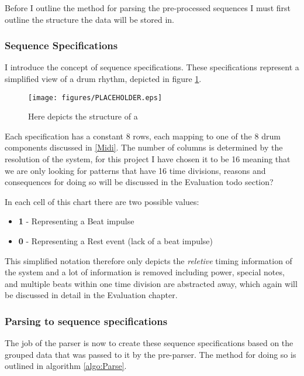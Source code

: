 \documentclass[12pt,twoside,notitlepage]{report}
\begin{document}
			Before I outline the method for parsing the pre-processed sequences I must first outline the structure the data will be stored in.
			
			\subsubsection{Sequence Specifications}
				I introduce the concept of sequence specifications. These specifications represent a simplified view of a drum rhythm, depicted in figure \ref{fig:seqSpec}.
				
            \begin{figure}[h]
			\centerline{\texttt{[image: figures/PLACEHOLDER.eps]}}
			\caption{\label{fig:seqSpec} Here depicts the structure of a }
\end{figure}

				Each specification has a constant 8 rows, each mapping to one of the 8 drum components discussed in \ref{Midi}. The number of columns is determined by the resolution of the system, for this project I have chosen it to be 16 meaning that we are only looking for patterns that have 16 time divisions, reasons and consequences for doing so will be discussed in the Evaluation todo section?
				
				In each cell of this chart there are two possible values:
					\begin{itemize}
						\item{\textbf{1} - Representing a Beat impulse}
						\item{\textbf{0} - Representing a Rest event (lack of a beat impulse)}
					\end{itemize}
					
				This simplified notation therefore only depicts the \emph{reletive} timing information of the system and a lot of information is removed including power, special notes, and multiple beats within one time division are abstracted away, which again will be discussed in detail in the Evaluation chapter.
				
				\subsubsection{Parsing to sequence specifications}
				
				The job of the parser is now to create these sequence specifications based on the grouped data that was passed to it by the pre-parser. The method for doing so is outlined in algorithm \ref{algo:Parse}.
				
\end{document}
